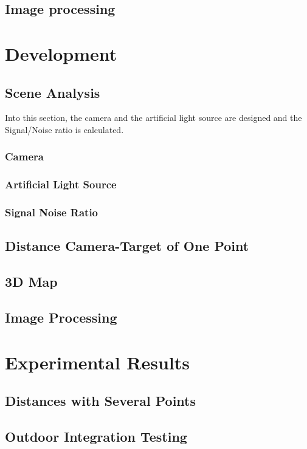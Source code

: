 \documentclass[12pt,a4paper,fleqn, onesside]{report}
\begin{document}
\section{Image processing}


\chapter{Development}
\section{Scene Analysis}
Into this section, the camera and the artificial light source are designed and the Signal/Noise ratio is calculated.
\subsection{Camera}

\subsection{Artificial Light Source}

\subsection{Signal Noise Ratio}


\section{Distance Camera-Target of One Point}

\section{3D Map}

\section{Image Processing}



\chapter{Experimental Results}

\section{Distances with Several Points}

\section{Outdoor Integration Testing}

\end{document}
